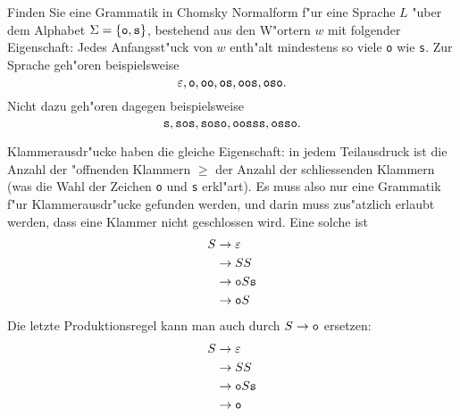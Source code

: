 Finden Sie eine Grammatik in Chomsky Normalform f"ur eine Sprache
$L$ "uber dem Alphabet
$\Sigma=\{\text{\tt o},\text{\tt s}\}$, bestehend aus den W"ortern
$w$ mit folgender Eigenschaft: Jedes Anfangsst"uck von $w$ enth"alt mindestens
so viele {\tt o} wie {\tt s}. Zur Sprache geh"oren beispielsweise
\[
\varepsilon,
\text{\tt o},
\text{\tt oo},
\text{\tt os},
\text{\tt oos},
\text{\tt oso}.
\]
Nicht dazu geh"oren dagegen beispielsweise
\[
\text{\tt s},
\text{\tt sos},
\text{\tt soso},
\text{\tt oosss},
\text{\tt osso}.
\]

\begin{loesung}
Klammerausdr"ucke haben die gleiche Eigenschaft: in jedem Teilausdruck
ist die Anzahl der "offnenden Klammern $\ge$ der Anzahl der schliessenden
Klammern (was die Wahl der Zeichen {\tt o} und {\tt s} erkl"art). Es muss
also nur eine Grammatik f"ur Klammerausdr"ucke gefunden werden, und darin
muss zus"atzlich erlaubt werden, dass eine Klammer nicht geschlossen
wird. Eine solche ist
\begin{align*}
S&\rightarrow \varepsilon\\
 &\rightarrow SS\\
 &\rightarrow {\tt o}S{\tt s}\\
 &\rightarrow {\tt o}S
\end{align*}
Die letzte Produktionsregel kann man auch durch $S\rightarrow{\tt o}$
ersetzen:
\begin{align*}
S&\rightarrow \varepsilon\\
 &\rightarrow SS\\
 &\rightarrow {\tt o}S{\tt s}\\
 &\rightarrow {\tt o}
\end{align*}


\end{loesung}

